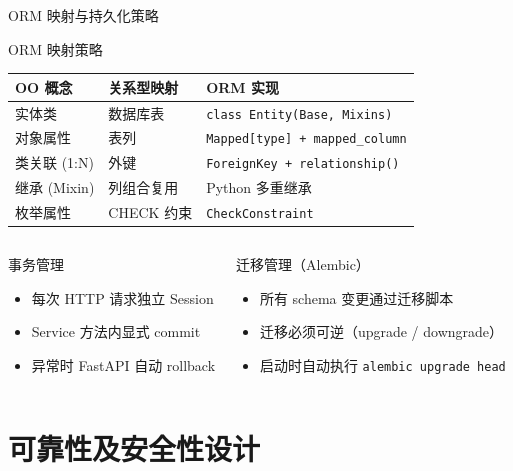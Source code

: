 \documentclass[aspectratio=169,UTF8]{ctexbeamer}
\begin{document}
\begin{frame}{ORM 映射与持久化策略}
    \begin{block}{ORM 映射策略}
        \small
        \begin{tabularx}{\linewidth}{lXX}
            \toprule
            \textbf{OO 概念} & \textbf{关系型映射} & \textbf{ORM 实现} \\
            \midrule
            实体类 & 数据库表 & \texttt{class Entity(Base, Mixins)} \\
            对象属性 & 表列 & \texttt{Mapped[type] + mapped\_column} \\
            类关联 (1:N) & 外键 & \texttt{ForeignKey + relationship()} \\
            继承 (Mixin) & 列组合复用 & Python 多重继承 \\
            枚举属性 & CHECK 约束 & \texttt{CheckConstraint} \\
            \bottomrule
        \end{tabularx}
    \end{block}
    \begin{columns}[T]
        \begin{exampleblock}{事务管理}
            \begin{itemize}
                \item 每次 HTTP 请求独立 Session
                \item Service 方法内显式 commit
                \item 异常时 FastAPI 自动 rollback
            \end{itemize}
        \end{exampleblock}
        \begin{exampleblock}{迁移管理（Alembic）}
            \begin{itemize}
                \item 所有 schema 变更通过迁移脚本
                \item 迁移必须可逆（upgrade / downgrade）
                \item 启动时自动执行 \texttt{alembic upgrade head}
            \end{itemize}
        \end{exampleblock}
    \end{columns}
\end{frame}

\section{可靠性及安全性设计}
\end{document}
